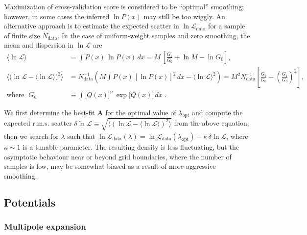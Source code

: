 \documentclass[12pt]{article}
\newcommand{\bA}{\boldsymbol{A}}
\begin{document}
Maximization of cross-validation score is considered to be ``optimal'' smoothing; however, in some cases the inferred $\ln P(x)$ may still be too wiggly. An alternative approach is to estimate the expected scatter in $\ln\mathcal{L}_\mathrm{data}$ for a sample of finite size $N_\mathrm{data}$. In the case of uniform-weight samples and zero smoothing, the mean and dispersion in $\ln\mathcal{L}$ are
\begin{align}
\big\langle\ln\mathcal{L}\big\rangle &=
  \int P(x)\,\ln P(x)\, dx = M\,\left[\frac{G_1}{G_0} + \ln M - \ln G_0\right] ,\\
\Big\langle\big(\ln\mathcal{L}-\langle\ln\mathcal{L}\rangle\big)^2\Big\rangle &=
  N_\mathrm{data}^{-1} \left( M\!\int\! P(x)\,[\ln P(x)]^2\, dx - \big\langle\ln\mathcal{L}\big\rangle^2 \right) =
  M^2 N_\mathrm{data}^{-1} \left[\frac{G_2}{G_0} - \left(\frac{G_1}{G_0}\right)^{\!2}\right]\! , \nonumber\\
\mbox{where }\; G_n &\equiv \int \big[Q(x)\big]^n\, \exp\big[Q(x)\big]\,dx\;.  \nonumber
\end{align}

We first determine the best-fit $\bA$ for the optimal value of $\lambda_\mathrm{opt}$ and compute the expected r.m.s. scatter $\delta\ln\mathcal{L}\equiv \sqrt{\langle(\ln\mathcal{L}-\langle\ln\mathcal{L}\rangle)^2\rangle}$ from the above equation; then we search for $\lambda$ such that $\ln\mathcal{L}_\mathrm{data}(\lambda) = \ln\mathcal{L}_\mathrm{data}(\lambda_\mathrm{opt}) - \kappa\, \delta\ln\mathcal{L}$, where $\kappa\sim 1$ is a tunable parameter. The resulting density is less fluctuating, but the asymptotic behaviour near or beyond grid boundaries, where the number of samples is low, may be somewhat biased as a result of more aggressive smoothing.


\subsection{Potentials}  \label{sec:PotentialDetails}


\subsubsection{Multipole expansion}  \label{sec:PotentialMultipoleDetails}
\end{document}
